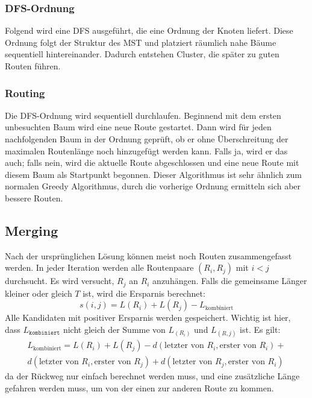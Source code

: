 \documentclass[a4paper,10pt,ngerman]{scrartcl}
\begin{document}
    \subsubsection{DFS-Ordnung}
    Folgend wird eine DFS ausgeführt, die eine Ordnung der Knoten liefert. Diese Ordnung folgt der Struktur des MST und
    platziert räumlich nahe Bäume sequentiell hintereinander. Dadurch entstehen Cluster, die später zu guten Routen
    führen.

    \subsubsection{Routing}
    Die DFS-Ordnung wird sequentiell durchlaufen. Beginnend mit dem ersten unbesuchten Baum wird eine neue Route
    gestartet. Dann wird für jeden nachfolgenden Baum in der Ordnung geprüft, ob er ohne Überschreitung der maximalen
    Routenlänge noch hinzugefügt werden kann. Falls ja, wird er das auch; falls nein, wird die aktuelle Route
    abgeschlossen und eine neue Route mit diesem Baum als Startpunkt begonnen.
    Dieser Algorithmus ist sehr ähnlich zum normalen Greedy Algorithmus, durch die vorherige Ordnung ermitteln sich
    aber bessere Routen.

    \subsection{Merging}
    Nach der ursprünglichen Lösung können meist noch Routen zusammengefasst werden.
    In jeder Iteration werden alle Routenpaare $(R_i, R_j)$ mit $i < j$ durchsucht. Es wird versucht, $R_j$ an $R_i$
    anzuhängen. Falls die gemeinsame Länger kleiner oder gleich $T$ ist, wird die Ersparnis berechnet:
    \[
        s(i, j) = L(R_i) + L(R_j) - L_{\text{kombiniert}}
    \]
    Alle Kandidaten mit positiver Ersparnis werden gespeichert. Wichtig ist hier, dass $L_{\texttt{kombiniert}}$ nicht
    gleich der Summe von $L_(R_i)$ und $L_(R, j)$ ist. Es gilt:
    \[
        \begin{align}
        L_{\text{kombiniert}} = L(R_i) + L(R_j) - d(\text{letzter von } R_i, \text{erster von } R_i) + \\
        d(\text{letzter von } R_i, \text{erster von } R_j) + d(\text{letzter von } R_j, \text{erster von } R_i)
        \end{align}
    \]
    da der Rückweg nur einfach berechnet werden muss, und eine zusätzliche Länge gefahren werden muss, um von der einen
    zur anderen Route zu kommen.
\end{document}
